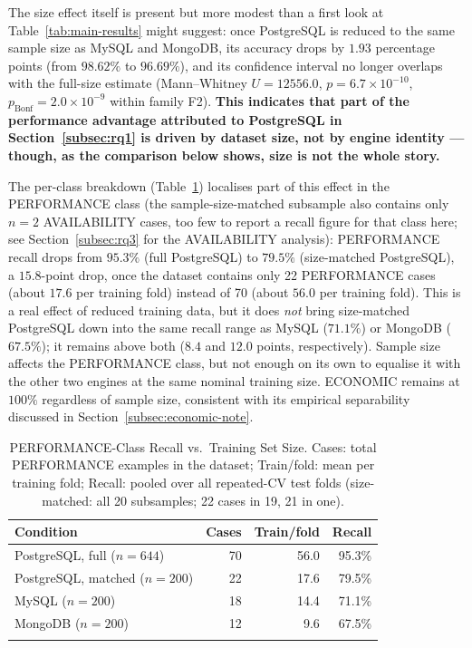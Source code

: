 \documentclass[iicol,pdflatex,sn-mathphys-num]{sn-jnl}
\theoremstyle{thmstyleone}
\theoremstyle{thmstylethree}
\begin{document}
The size effect itself is present but more modest than a first look at
Table~\ref{tab:main-results} might suggest: once PostgreSQL is reduced
to the same sample size as MySQL and MongoDB, its accuracy drops by
$1.93$ percentage points (from $98.62\%$ to $96.69\%$), and its
confidence interval no longer overlaps with the full-size estimate
(Mann--Whitney $U=12556.0$, $p=6.7\times10^{-10}$,
$p_{\text{Bonf}}=2.0\times10^{-9}$ within family F2). \textbf{This
indicates that part of the performance advantage attributed to
PostgreSQL in Section~\ref{subsec:rq1} is driven by dataset size, not
by engine identity --- though, as the comparison below shows, size is
not the whole story.}

The per-class breakdown (Table~\ref{tab:size-control-classes})
localises part of this effect in the PERFORMANCE class (the
sample-size-matched subsample also contains only $n=2$ AVAILABILITY
cases, too few to report a recall figure for that class here; see
Section~\ref{subsec:rq3} for the AVAILABILITY analysis): PERFORMANCE
recall drops from $95.3\%$ (full PostgreSQL) to $79.5\%$ (size-matched
PostgreSQL), a $15.8$-point drop, once the dataset contains only 22
PERFORMANCE cases (about $17.6$ per training fold) instead of 70 (about
$56.0$ per training fold). This is a real effect of reduced training
data, but it does \emph{not} bring size-matched PostgreSQL down into the
same recall range as MySQL ($71.1\%$) or MongoDB ($67.5\%$); it remains
above both ($8.4$ and $12.0$ points, respectively). Sample size affects the PERFORMANCE class, but not
enough on its own to equalise it with the other two engines at the
same nominal training size. ECONOMIC remains at $100\%$ regardless of
sample size, consistent with its empirical separability discussed in
Section~\ref{subsec:economic-note}.

\begin{table}[h]
\caption{PERFORMANCE-Class Recall vs.\ Training Set Size. Cases: total
PERFORMANCE examples in the dataset; Train/fold: mean per training
fold; Recall: pooled over all repeated-CV test folds (size-matched:
all 20 subsamples; 22 cases in 19, 21 in one).}\label{tab:size-control-classes}
\footnotesize
\begin{tabular}{@{}p{3.2cm}rrr@{}}
\toprule
Condition & Cases & Train/fold & Recall \\
\midrule
PostgreSQL, full ($n=644$)         & 70 & 56.0 & 95.3\% \\
PostgreSQL, matched ($n=200$)      & 22 & 17.6 & 79.5\% \\
MySQL ($n=200$)                    & 18 & 14.4 & 71.1\% \\
MongoDB ($n=200$)                  & 12 & 9.6  & 67.5\% \\
\botrule
\end{tabular}
\end{table}
\end{document}
